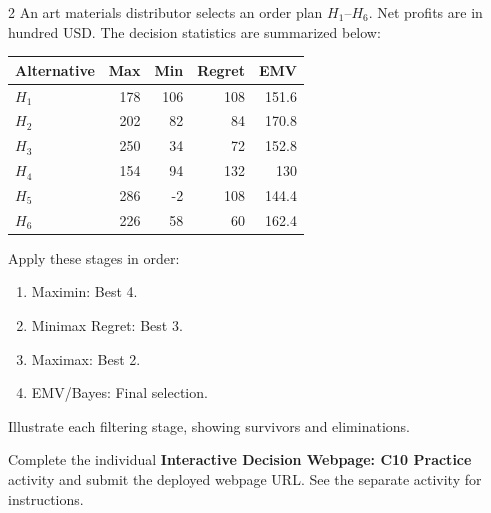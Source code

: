 \begin{multicols}{2}
\columnbreak
{}
An art materials distributor selects an order plan $H_1$--$H_6$. Net profits are in hundred USD. The decision statistics are summarized below:
\vspace{-3mm}
\begin{center}\small\setlength{\tabcolsep}{4pt}
	\begin{tabular}{lrrrr}\toprule
		Alternative & Max & Min & Regret & EMV\\ \midrule
		$H_1$ & 178 & 106 & 108 & 151.6\\
		$H_2$ & 202 & 82 & 84 & 170.8\\
		$H_3$ & 250 & 34 & 72 & 152.8\\
		$H_4$ & 154 & 94 & 132 & 130\\
		$H_5$ & 286 & -2 & 108 & 144.4\\
		$H_6$ & 226 & 58 & 60 & 162.4\\
		\bottomrule
	\end{tabular}
\end{center}
\vspace{-3mm}
Apply these stages in order:
\begin{enumerate}[leftmargin=*]
	\item Maximin: Best 4.
	\item Minimax Regret: Best 3.
	\item Maximax: Best 2.
	\item EMV/Bayes: Final selection.
\end{enumerate}
Illustrate each filtering stage, showing survivors and eliminations.

\par
{}
		Complete the individual \textbf{Interactive Decision Webpage: C10 Practice} activity and submit the deployed webpage URL. See the separate activity for instructions.
		
	\end{multicols}

